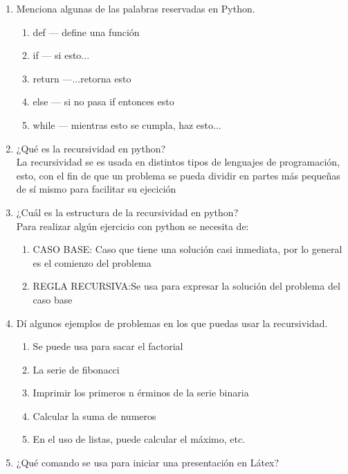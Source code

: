 \documentclass[letterpaper, 12pt, oneside]{article}%
\begin{document}
\begin{enumerate}
		\item 
		Menciona algunas de las palabras reservadas en Python.\\
		\begin{enumerate}
			\item 
			def --- define una función
			\item
			if --- si esto...
			\item
			return ---...retorna esto
			\item
			else --- si no pasa if entonces esto
			\item
			while --- mientras esto se cumpla, haz esto...
		\end{enumerate}
		\item 
		¿Qué es la recursividad en python?\\
		La recursividad se es usada en distintos tipos de lenguajes de programación, esto, con el fin de que un problema se pueda dividir en partes más pequeñas de sí mismo para facilitar su ejecición 
		\item 
		¿Cuál es la estructura de la recursividad en python?\\ 
		Para realizar algún ejercicio con python se necesita de:
		\begin{enumerate}
			\item 
			CASO BASE: Caso que tiene una solución casi inmediata, por lo general es el comienzo del problema
			\item 
			REGLA RECURSIVA:Se usa para expresar la solución del problema del caso base
		\end{enumerate}
		\item 
		Dí algunos ejemplos de problemas en los que puedas usar la recursividad.
		\begin{enumerate}
			\item 
			Se puede usa para sacar el factorial
			\item 
			La serie de fibonacci
			\item 
			Imprimir los primeros n érminos de la serie binaria
			\item 
			Calcular la suma de numeros
			\item 
			En el uso de listas, puede calcular el máximo, etc.
		\end{enumerate}
		\item
		¿Qué comando se usa para iniciar una presentación en Látex?\\

\end{enumerate}
\end{document}
